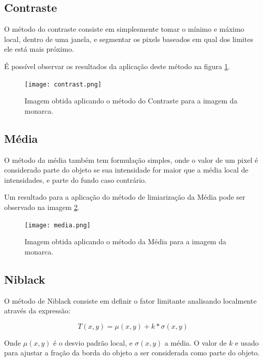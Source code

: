 \documentclass[conference]{IEEEtran}
\begin{document}
\subsection{Contraste}

    O método do contraste consiste em simplesmente tomar o mínimo e máximo local, dentro de uma janela, e segmentar os pixels baseados em qual dos limites ele está mais próximo.

    É possível observar os resultados da aplicação deste método na figura \ref{fig:contrast}.

    \begin{figure}[ht]
        \centering
        \texttt{[image: contrast.png]}
        \caption{Imagem obtida aplicando o método do Contraste para a imagem da monarca.}
        \label{fig:contrast}
    \end{figure}

\subsection{Média}

    O método da média também tem formulação simples, onde o valor de um pixel é considerado parte do objeto se sua intensidade for maior que a média local de intensidades, e parte do fundo caso contrário.

    Um resultado para a aplicação do método de limiarização da Média pode ser observado na imagem \ref{fig:avg}.

    \begin{figure}[ht]
        \centering
        \texttt{[image: media.png]}
        \caption{Imagem obtida aplicando o método da Média para a imagem da monarca.}
        \label{fig:avg}
    \end{figure}

\subsection{Niblack}

    O método de Niblack consiste em definir o fator limitante analisando localmente através da expressão:

    \begin{equation}
        T(x,y) = \mu (x,y) + k * \sigma (x,y)
    \end{equation}

    Onde $\mu (x,y)$ é o desvio padrão local, e $\sigma (x,y)$ a média.  O valor de $k$ e usado para ajustar a fração da borda do objeto a ser considerada como parte do objeto.
\end{document}
